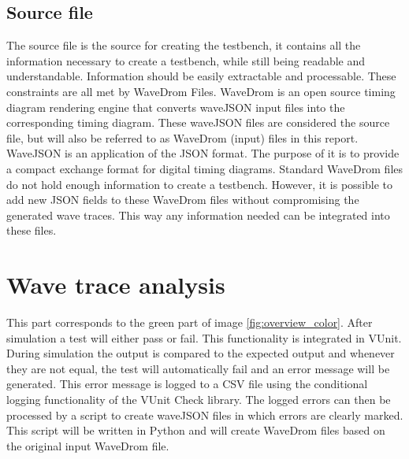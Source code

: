 \subsection{Source file}
The source file is the source for creating the testbench, it contains all the information necessary to create a testbench, while still being readable and understandable. Information should be easily extractable and processable. These constraints are all met by WaveDrom Files.
\npar
WaveDrom is an open source timing diagram rendering engine that converts waveJSON input files into the corresponding timing diagram. These waveJSON files are considered the source file, but will also be referred to as WaveDrom (input) files in this report.
\npar
WaveJSON \cite{wavejson}
 is an application of the JSON format. The purpose of it is to provide a compact exchange format for digital timing diagrams.
\npar
Standard WaveDrom files do not hold enough information to create a testbench. However, it is possible to add new JSON fields to these WaveDrom files without compromising the generated wave traces. This way any information needed can be integrated into these files.
\section{Wave trace analysis}
This part corresponds to the green part of image \ref{fig:overview_color}. After simulation a test will either pass or fail. This functionality is integrated in VUnit. During simulation the output is compared to the expected output and whenever they are not equal, the test will automatically fail and an error message will be generated. This error message is logged to a CSV file using the conditional logging functionality of the VUnit Check library.
\npar
The logged errors can then be processed by a script to create waveJSON files in which errors are clearly marked. This script will be written in Python and will create WaveDrom files based on the original input WaveDrom file.